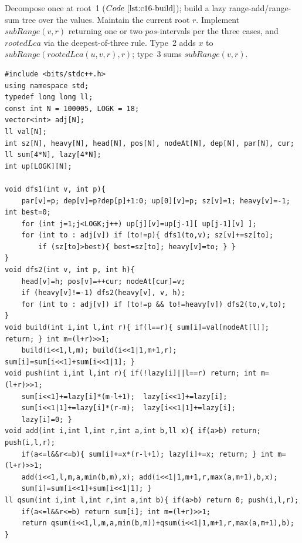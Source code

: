 Decompose once at root~1 (\(\coderef{c16-build}\)); build a lazy range-add/range-sum tree over the values. Maintain the current root \(r\). Implement \(\mathit{subRange}(v,r)\) returning one or two \(\mathit{pos}\)-intervals per the three cases, and \(\mathit{rootedLca}\) via the deepest-of-three rule. Type~2 adds \(x\) to \(\mathit{subRange}(\mathit{rootedLca}(u,v,r),r)\); type~3 sums \(\mathit{subRange}(v,r)\).

\begin{lstlisting}[caption={CF 916E: one HLD order + Ch.20 lazy sum tree; re-rooted subtree as one or two pos-intervals; rooted LCA as the deepest of three plain LCAs}, label={lst:c16-916e}]
#include <bits/stdc++.h>
using namespace std;
typedef long long ll;
const int N = 100005, LOGK = 18;
vector<int> adj[N];
ll val[N];
int sz[N], heavy[N], head[N], pos[N], nodeAt[N], dep[N], par[N], cur;
ll sum[4*N], lazy[4*N];
int up[LOGK][N];

void dfs1(int v, int p){
    par[v]=p; dep[v]=p?dep[p]+1:0; up[0][v]=p; sz[v]=1; heavy[v]=-1; int best=0;
    for (int j=1;j<LOGK;j++) up[j][v]=up[j-1][ up[j-1][v] ];
    for (int to : adj[v]) if (to!=p){ dfs1(to,v); sz[v]+=sz[to];
        if (sz[to]>best){ best=sz[to]; heavy[v]=to; } }
}
void dfs2(int v, int p, int h){
    head[v]=h; pos[v]=++cur; nodeAt[cur]=v;
    if (heavy[v]!=-1) dfs2(heavy[v], v, h);
    for (int to : adj[v]) if (to!=p && to!=heavy[v]) dfs2(to,v,to);
}
void build(int i,int l,int r){ if(l==r){ sum[i]=val[nodeAt[l]]; return; } int m=(l+r)>>1;
    build(i<<1,l,m); build(i<<1|1,m+1,r); sum[i]=sum[i<<1]+sum[i<<1|1]; }
void push(int i,int l,int r){ if(!lazy[i]||l==r) return; int m=(l+r)>>1;
    sum[i<<1]+=lazy[i]*(m-l+1);  lazy[i<<1]+=lazy[i];
    sum[i<<1|1]+=lazy[i]*(r-m);  lazy[i<<1|1]+=lazy[i];
    lazy[i]=0; }
void add(int i,int l,int r,int a,int b,ll x){ if(a>b) return; push(i,l,r);
    if(a<=l&&r<=b){ sum[i]+=x*(r-l+1); lazy[i]+=x; return; } int m=(l+r)>>1;
    add(i<<1,l,m,a,min(b,m),x); add(i<<1|1,m+1,r,max(a,m+1),b,x);
    sum[i]=sum[i<<1]+sum[i<<1|1]; }
ll qsum(int i,int l,int r,int a,int b){ if(a>b) return 0; push(i,l,r);
    if(a<=l&&r<=b) return sum[i]; int m=(l+r)>>1;
    return qsum(i<<1,l,m,a,min(b,m))+qsum(i<<1|1,m+1,r,max(a,m+1),b); }


\end{lstlisting}

